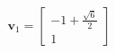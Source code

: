 \documentclass[preview]{standalone}
\begin{document}
\begin{align*}
\mathbf{v}_1 = \left[\begin{matrix}-1 + \frac{\sqrt{6}}{2}\\1\end{matrix}\right]
\end{align*}
\end{document}
